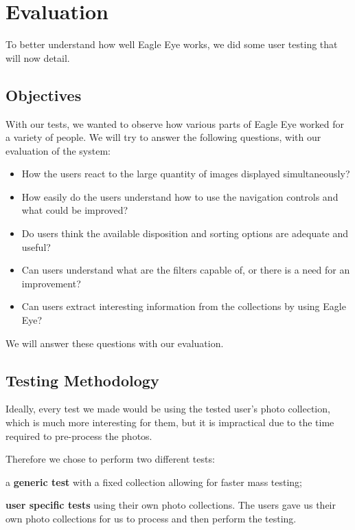 \chapter{Evaluation} %
\label{chapter:evaluation}


To better understand how well Eagle Eye works, we did some user testing that will now detail.

\section{Objectives}

With our tests, we wanted to observe how various parts of Eagle Eye worked for a variety of people. 
We will try to answer the following questions, with our evaluation of the system:

\begin{itemize}
\item How the users react to the large quantity of images displayed simultaneously?
\item How easily do the users understand how to use the navigation controls and what could be improved?
\item Do users think the available disposition and sorting options are adequate and useful?
\item Can users understand what are the filters capable of, or there is a need for an improvement?
\item Can users extract interesting information from the collections by using Eagle Eye?
\end{itemize}

We will answer these questions with our evaluation.

\section{Testing Methodology}

Ideally, every test we made would be using the tested user's photo collection, which is much more interesting for them, but it is impractical due to the time required to pre-process the photos.

Therefore we chose to perform two different tests:
\begin{myitemize}
\item a \textbf{generic test} with a fixed collection allowing for faster mass testing;
\item \textbf{user specific tests} using their own photo collections. The users gave us their own photo collections for us to process and then perform the testing.
\end{myitemize}

